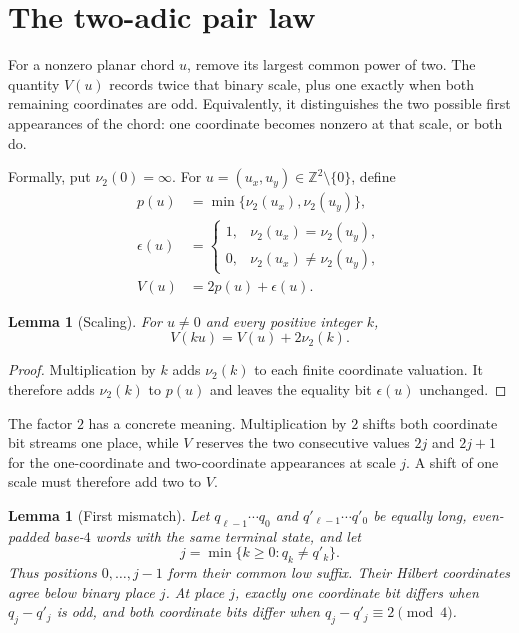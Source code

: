 \documentclass[11pt]{article}
\newtheorem{lemma}[theorem]{Lemma}
\theoremstyle{definition}
\theoremstyle{remark}
\newcommand{\Z}{\mathbb Z}
\newcommand{\vTwo}{\nu_2}
\begin{document}
\section{The two-adic pair law}\label{sec:pair}

For a nonzero planar chord $u$, remove its largest common power of two.
The quantity $V(u)$ records twice that binary scale, plus one exactly when
both remaining coordinates are odd.  Equivalently, it distinguishes the two
possible first appearances of the chord: one coordinate becomes nonzero at
that scale, or both do.

Formally, put $\vTwo(0)=\infty$.  For
$u=(u_x,u_y)\in\Z^2\setminus\{0\}$, define
\begin{align}
 p(u)&=\min\{\vTwo(u_x),\vTwo(u_y)\},\\
 \epsilon(u)&=
 \begin{cases}
 1,&\vTwo(u_x)=\vTwo(u_y),\\
 0,&\vTwo(u_x)\neq\vTwo(u_y),
 \end{cases}\\
 V(u)&=2p(u)+\epsilon(u).\label{eq:V}
\end{align}

\begin{lemma}[Scaling]\label{lem:scaling}
For $u\neq0$ and every positive integer $k$,
\[
 V(ku)=V(u)+2\vTwo(k).
\]
\end{lemma}

\begin{proof}
Multiplication by $k$ adds $\vTwo(k)$ to each finite coordinate valuation.
It therefore adds $\vTwo(k)$ to $p(u)$ and leaves the equality bit
$\epsilon(u)$ unchanged.
\end{proof}
The factor $2$ has a concrete meaning.  Multiplication by $2$ shifts both
coordinate bit streams one place, while $V$ reserves the two consecutive
values $2j$ and $2j+1$ for the one-coordinate and two-coordinate appearances
at scale $j$.  A shift of one scale must therefore add two to $V$.

\begin{lemma}[First mismatch]\label{lem:mismatch}
Let $q_{\ell-1}\cdots q_0$ and $q'_{\ell-1}\cdots q'_0$ be equally long,
even-padded base-$4$ words with the same terminal state, and let
\[
 j=\min\{k\geq0:q_k\neq q'_k\}.
\]
Thus positions $0,\ldots,j-1$ form their common low suffix.  Their Hilbert
coordinates agree below binary place $j$.  At place $j$, exactly one
coordinate bit differs when $q_j-q'_j$ is odd, and both coordinate bits
differ when $q_j-q'_j\equiv2\pmod4$.
\end{lemma}
\end{document}
